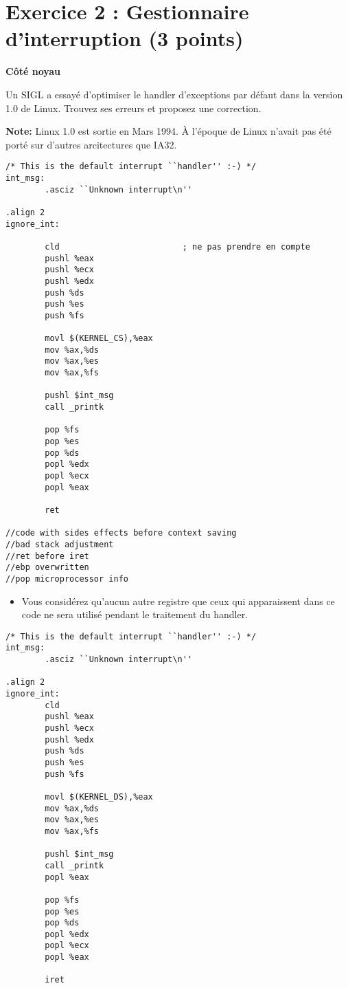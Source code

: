 \newpage

\section*{Exercice 2 : Gestionnaire d'interruption (3 points)}

{\bf C\^ot\'e noyau}

Un SIGL a essay\'e d'optimiser le handler d'exceptions par d\'efaut dans la version 1.0 de Linux. Trouvez ses erreurs et proposez une correction.

{\bf Note:} Linux 1.0 est sortie en Mars 1994. \`A l'\'epoque de Linux n'avait pas \'et\'e port\'e sur d'autres arcitectures que IA32.

\begin{verbatim}
/* This is the default interrupt ``handler'' :-) */
int_msg:
        .asciz ``Unknown interrupt\n''

.align 2
ignore_int:

        cld                         ; ne pas prendre en compte
        pushl %eax
        pushl %ecx
        pushl %edx
        push %ds
        push %es
        push %fs

        movl $(KERNEL_CS),%eax
        mov %ax,%ds
        mov %ax,%es
        mov %ax,%fs

        pushl $int_msg
        call _printk

        pop %fs
        pop %es
        pop %ds
        popl %edx
        popl %ecx
        popl %eax

        ret

//code with sides effects before context saving
//bad stack adjustment
//ret before iret
//ebp overwritten
//pop microprocessor info
\end{verbatim}

\begin{itemize}
\item Vous consid\'erez qu'aucun autre registre que ceux qui apparaissent dans ce code ne sera utilis\'e pendant le traitement du handler.
\end{itemize}

\begin{correction}
\begin{verbatim}
/* This is the default interrupt ``handler'' :-) */
int_msg:
        .asciz ``Unknown interrupt\n''

.align 2
ignore_int:
        cld
        pushl %eax
        pushl %ecx
        pushl %edx
        push %ds
        push %es
        push %fs

        movl $(KERNEL_DS),%eax
        mov %ax,%ds
        mov %ax,%es
        mov %ax,%fs

        pushl $int_msg
        call _printk
        popl %eax

        pop %fs
        pop %es
        pop %ds
        popl %edx
        popl %ecx
        popl %eax

        iret
\end{verbatim}
\end{correction}




